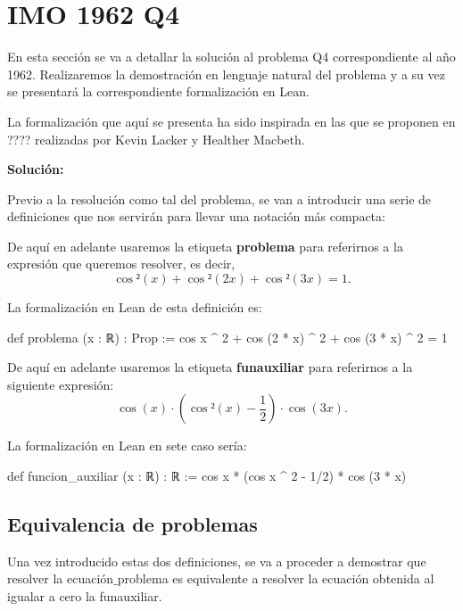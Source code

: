 \section{IMO 1962 Q4}

En esta sección se va a detallar la solución al problema Q4
correspondiente al año 1962. Realizaremos la demostración
en lenguaje natural del problema y a su vez se presentará la
correspondiente formalización en Lean.

La formalización que aquí se presenta ha sido inspirada en
las que se proponen en ???? realizadas por Kevin Lacker y
Healther Macbeth.



\noindent
{}

\textbf{Solución:}

Previo a la resolución como tal del problema, se van a
introducir una serie de definiciones que nos servirán
para llevar una notación más compacta:

\begin{definicion}\label{problema}
  De aquí en adelante usaremos la etiqueta \textbf{problema}
  para referirnos a la expresión que queremos resolver,
  es decir,
  \begin{equation}\label{expprob}
    \cos²(x)+\cos²(2x)+\cos²(3x)=1.
  \end{equation}
\end{definicion}

La formalización en Lean de esta definición es:
\begin{leancode}
 def problema (x : ℝ) : Prop :=
 cos x ^ 2 + cos (2 * x) ^ 2 + cos (3 * x) ^ 2 = 1
\end{leancode}

\begin{definicion}\label{funaux}
  De aquí en adelante usaremos la etiqueta
  \textbf{funauxiliar} para referirnos a la siguiente
  expresión:
  \begin{equation*}
    \cos(x)·(\cos²(x)-\frac{1}{2})·\cos(3x).
  \end{equation*}
\end{definicion}

La formalización en Lean en sete caso sería:
\begin{leancode}
def funcion_auxiliar (x : ℝ) : ℝ :=
cos x * (cos x ^ 2 - 1/2) * cos (3 * x)
\end{leancode}

\subsection{Equivalencia de problemas}
Una vez introducido estas dos definiciones, se va a proceder
a demostrar que resolver la ecuación\( \_ \)problema es
equivalente a resolver la ecuación obtenida al igualar a
cero la funauxiliar.

